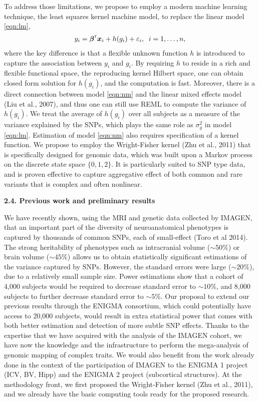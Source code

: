 \documentclass[12pt]{article}
\newcommand{\trans}{^{\mbox{\tiny {\sf T}}}}
\newcommand{\xbf}{{\bm x}}
\newcommand{\greekbold}[1]{\mbox{\boldmath $#1$}}
\newcommand{\betabf}{\greekbold{\beta}}
\begin{document}
To address those limitations, we propose to employ a modern machine learning technique, the least squares kernel machine model, to replace the linear model \eqref{eqn:lm},
\begin{eqnarray} \label{eqn:nm}
y_i = \betabf\trans \xbf_i + h(g_i) + \varepsilon_i, \;\; i = 1, \ldots, n,
\end{eqnarray}
where the key difference is that a flexible unknown function $h$ is introduced to capture the association between $y_i$ and $g_i$. By requiring $h$ to reside in a rich and flexible functional space, the reproducing kernel Hilbert space, one can obtain closed form solution for $h(g_i)$, and the computation is fast. Moreover, there is a direct connection between model \eqref{eqn:nm} and the linear mixed effects model (Liu et al., 2007), and thus one can still use REML to compute the variance of $h(g_i)$. We treat the average of $h(g_i)$ over all subjects as a measure of the variance explained by the SNPs, which plays the same role as $\sigma^2_g$ in model \eqref{eqn:lm}. Estimation of model \eqref{eqn:nm} also requires specification of a kernel function. We propose to employ the Wright-Fisher kernel (Zhu et al., 2011) that is specifically designed for genomic data, which was built upon a Markov process on the discrete state space $\{0,1,2\}$. It is particularly suited to SNP type data, and is proven effective to capture aggregative effect of both common and rare variants that is complex and often nonlinear. 
\medskip


\noindent
\textbf{2.4. Previous work and preliminary results}
\smallskip

\noindent
We have recently shown, using the MRI and genetic data collected by IMAGEN, that an important part of the diversity of neuroanatomical phenotypes is captured by thousands of common SNPs, each of small-effect (Toro et al 2014). The strong heritability of phenotypes such as intracranial volume ($\sim 50\%$) or brain volume ($\sim 45\%$) allows us to obtain statistically significant estimations of the variance captured by SNPs. However, the standard errors were large ($\sim 20\%$), due to a relatively small sample size. Power estimations show that a cohort of 4,000 subjects would be required to decrease standard error to $\sim 10\%$, and 8,000 subjects to further decrease standard error to $\sim 5\%$. Our proposal to extend our previous results through the ENIGMA consortium, which could potentially have access to 20,000 subjects, would result in extra statistical power that comes with both better estimation and detection of more subtle SNP effects. Thanks to the expertise that we have acquired with the analysis of the IMAGEN cohort, we have now the knowledge and the infrastructure to perform the mega-analysis of genomic mapping of complex traits. We would also benefit from the work already done in the context of the participation of IMAGEN to the ENIGMA 1 project (ICV, BV, Hipp) and the ENIGMA 2 project (subcortical structures). At the methodology front, we first proposed the Wright-Fisher kernel (Zhu et al., 2011), and we already have the basic computing tools ready for the proposed research. 
\bigskip
\end{document}
